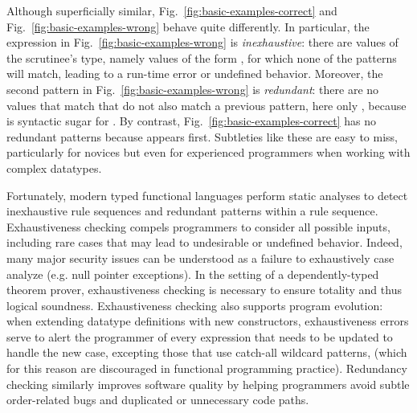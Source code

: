 Although superficially similar, Fig.~\ref{fig:basic-examples-correct} and Fig.~\ref{fig:basic-examples-wrong}
behave quite differently. In particular, the  expression in Fig.~\ref{fig:basic-examples-wrong} is \emph{inexhaustive}: there are values of the scrutinee's type, namely values of the form , for which none of the patterns will match, leading to a run-time error or undefined behavior. 
Moreover, the second pattern in Fig.~\ref{fig:basic-examples-wrong} is \emph{redundant}: there are no values that match  that do not also match a
previous pattern, here only , because \li{[x, y]} is syntactic sugar for .
By contrast, Fig.~\ref{fig:basic-examples-correct} has no redundant patterns because  appears first.
Subtleties like these are easy to miss, particularly for novices but even for experienced programmers when working with complex datatypes.

Fortunately,
modern typed functional languages perform static analyses to detect inexhaustive rule sequences and redundant patterns within a rule sequence.
Exhaustiveness checking compels programmers to consider all possible inputs, including rare cases that may lead to undesirable or undefined behavior. Indeed, many major security issues can be understood as a failure to exhaustively case analyze (e.g. null pointer exceptions).
In the setting of a dependently-typed theorem prover, exhaustiveness checking is necessary to ensure totality and thus logical soundness.
Exhaustiveness checking also supports program evolution: when extending datatype definitions with new constructors, exhaustiveness errors 
serve to alert the programmer of every  expression that needs to be updated to handle the new case, excepting those that use catch-all wildcard patterns, \li{_} (which for this reason are discouraged in functional programming practice).
Redundancy checking similarly improves software quality by helping programmers avoid subtle order-related bugs and duplicated or unnecessary code paths.



